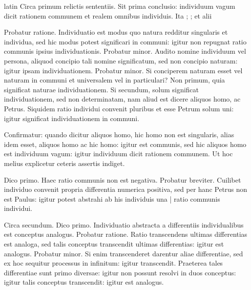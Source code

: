 \begin{otherlanguage*}{latin}
\pstart
Circa primum relictis sententiis. Sit prima conclusio:
individuum vagum dicit rationem communem et realem omnibus individuis. Ita ; ;  et alii 
\pend

\pstart
Probatur ratione. Individuatio est modus quo natura redditur singularis et individua, sed hic modus potest significari in communi:
igitur non repugnat ratio communis ipsius individuationis. Probatur minor. Audito nomine individuum vel persona, aliquod concipio tali nomine significatum, sed non concipio naturam:
igitur ipsam individuationem. Probatur minor. Si conciperem naturam esset vel naturam in communi et universalem vel in particulari? Non primum, quia significat naturae individuationem. Si secundum, solum significat individuationem, sed non determinatam, nam aliud est dicere aliquos homo, ac Petrus. Siquidem ratio individui convenit pluribus et esse Petrum solum uni:
igitur significat individuationem in communi. 
\pend

\pstart
Confirmatur:
quando dicitur aliquos homo, hic homo non est singularis, alias idem esset, aliquos homo ac hic homo:
igitur est communis, sed hic aliquos homo est individuum vagum:
igitur individuum dicit rationem communem. Ut hoc melius explicetur ceteris assertis indiget. 
\pend

\pstart
Dico primo. Haec ratio communis non est negativa. Probatur breviter. Cuilibet individuo convenit propria differentia numerica positiva, sed per hanc Petrus non est Paulus:
igitur potest abstrahi ab his individuis una \textnormal{|} ratio communis individui. 
\pend

\pstart
Circa secundum. Dico primo. Individuatio abstracta a differentiis individualibus est conceptus analogus. Probatur ratione. Ratio transcendens ultimas differentias est analoga, sed talis conceptus transcendit ultimas differentias:
igitur est analogus. Probatur minor. Si enim transcenderet darentur aliae differentiae, sed ex hoc sequitur processus in infinitum:
igitur transcendit. Praeterea tales differentiae sunt primo diversae:
igitur non possunt resolvi in duos conceptus:
igitur talis conceptus transcendit:
igitur est analogus. 
\pend


\end{otherlanguage*}
